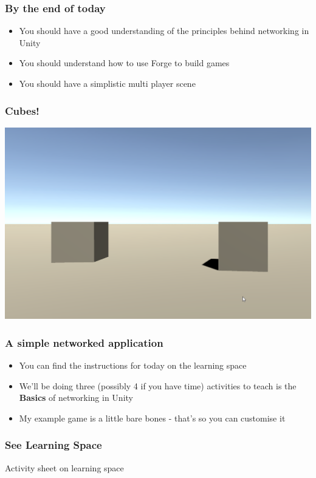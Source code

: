 \documentclass{beamer}
\begin{document}
	\begin{frame}
		\frametitle{By the end of today}
		
		\begin{itemize}
			\item You should have a good understanding of the principles behind networking in Unity
			\item You should understand how to use Forge to build games
			\item You should have a simplistic multi player scene
		\end{itemize}
	\end{frame}
	
	\begin{frame}
		\frametitle{Cubes!}
		
		\includegraphics{unity_twocubes}
	\end{frame}
	
	\begin{frame}
		\frametitle{A simple networked application}
		
		\begin{itemize}
			\item You can find the instructions for today on the learning space
			\item We'll be doing three (possibly 4 if you have time) activities to teach is the \textbf{Basics} of networking in Unity
			\item My example game is a little bare bones - that's so you can customise it 
		\end{itemize}
	\end{frame}

	\begin{frame}
		\frametitle{See Learning Space}
		
		\begin{center}
			Activity sheet on learning space
		\end{center}
		
	\end{frame}
	
\end{document}
